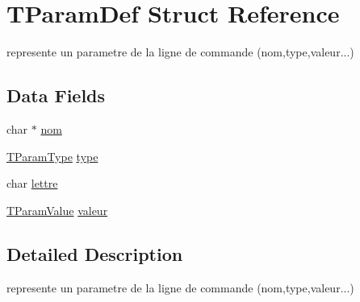 \hypertarget{structTParamDef}{\section{T\-Param\-Def Struct Reference}
\label{structTParamDef}
}


represente un parametre de la ligne de commande (nom,type,valeur...)  


\subsection*{Data Fields}
\begin{DoxyCompactItemize}
\item 
char $\ast$ \hyperlink{structTParamDef_afa78db012abc7fecd18c60d6154e04f8}{nom}
\item 
\hyperlink{tp1__b_8c_a07d4e5a29d675892ddc5f377533c06a5}{T\-Param\-Type} \hyperlink{structTParamDef_aaa8c69f39c6dd02a968dc15044810327}{type}
\item 
char \hyperlink{structTParamDef_a66254f6368c5542d3f14afdd1ea1e621}{lettre}
\item 
\hyperlink{unionTParamValue}{T\-Param\-Value} \hyperlink{structTParamDef_a3f5cbf75e393d35bb230dfe293f7c7ba}{valeur}
\end{DoxyCompactItemize}


\subsection{Detailed Description}
represente un parametre de la ligne de commande (nom,type,valeur...) 

